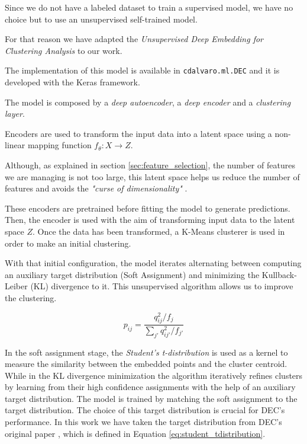 \documentclass[11pt, a4paper, english]{book}
\begin{document}
Since we do not have a labeled dataset to train a supervised model,
we have no choice but to use an unsupervised self-trained model.

For that reason we have adapted the \emph{Unsupervised Deep Embedding for Clustering Analysis} to our work.

The implementation of this model is available in \verb|cdalvaro.ml.DEC|
and it is developed with the Keras framework.

The model is composed by a \emph{deep autoencoder}, a \emph{deep encoder} and a \emph{clustering layer}.

Encoders are used to transform the input data into a latent space
using a non-linear mapping function $f_{\theta} : X \rightarrow Z$.

Although, as explained in section \ref{sec:feature_selection},
the number of features we are managing is not too large,
this latent space helps us reduce the number of features
and avoids the \emph{"curse of dimensionality"} \cite{bellman1961curse}.

These encoders are pretrained before fitting the model to generate predictions.
Then, the encoder is used with the aim of transforming input data to the latent space $Z$.
Once the data has been transformed, a K-Means clusterer is used in order to make an initial clustering.

With that initial configuration,
the model iterates alternating between computing an auxiliary target distribution (Soft Assignment)
and minimizing the Kullback-Leiber (KL) divergence \cite{kullback1951information} to it.
This unsupervised algorithm allows us to improve the clustering.

\begin{equation}
  p_{ij} = \frac{q^{2}_{ij} / f_{j}}{\sum_{j'}q^{2}_{ij'}/f_{j'}}
  \label{eq:student_tdistribution}
\end{equation}

In the soft assignment stage,
the \emph{Student's t-distribution} is used as a kernel to measure the similarity
between the embedded points and the cluster centroid.
While in the KL divergence minimization the algorithm iteratively refines clusters by learning
from their high confidence assignments with the help of an auxiliary target distribution.
The model is trained by matching the soft assignment to the target distribution.
The choice of this target distribution is crucial for DEC's performance.
In this work we have taken the target distribution from DEC's original paper \cite{xie2016unsupervised},
which is defined in Equation \ref{eq:student_tdistribution}.
\end{document}
